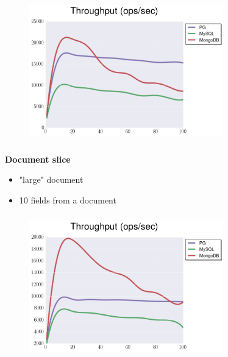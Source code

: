 \documentclass[usenames,dvipsnames, 18pt, compress, aspectratio=169]{beamer}
\begin{document}
\begin{frame}
    \frametitle{}
    \begin{center}
    \begin{figure}
        \includegraphics[width=0.75\textwidth,center]{benchmarks/select_slice_1_btree_throughput.png}
    \end{figure}
    \end{center}
\end{frame}

\begin{frame}
    \frametitle{}
    \begin{center}
        \textbf{Document slice}
        \begin{itemize}[label={}]
            \item "large" document
            \item 10 fields from a document
        \end{itemize}
    \end{center}
\end{frame}

\begin{frame}
    \frametitle{}
    \begin{center}
    \begin{figure}
        \includegraphics[width=0.75\textwidth,center]{benchmarks/select_slice_10_btree_throughput.png}
    \end{figure}
    \end{center}
\end{frame}
\end{document}
